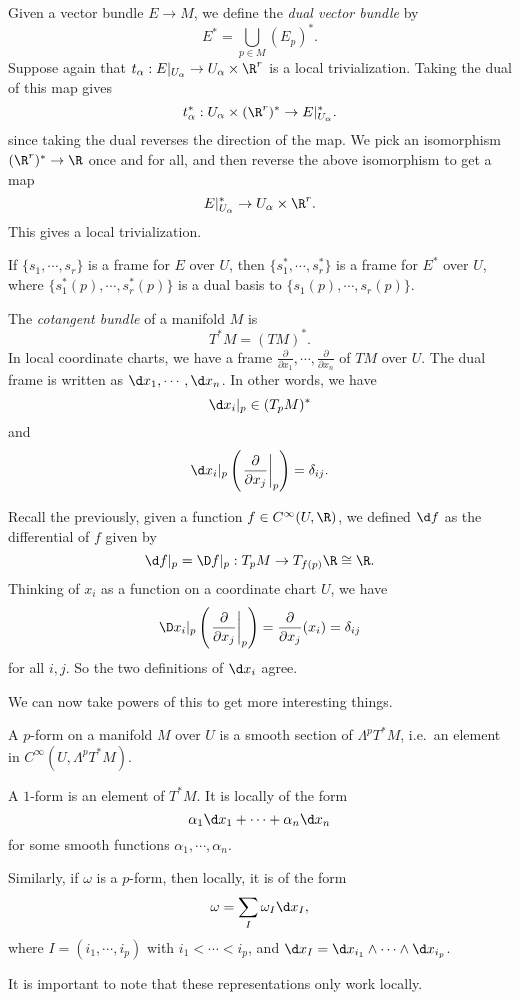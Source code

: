 \documentclass[a4paper]{article}
\begin{document}
\begin{defi}
  Given a vector bundle $E \to M$, we define the \emph{dual vector bundle} by
  \[
    E^* = \bigcup_{p \in M} (E_p)^*.
  \]
  Suppose again that $t_\alpha: E|_{U_\alpha} \to U_\alpha \times \R^r$ is a local trivialization. Taking the dual of this map gives
  \[
    t_\alpha^*: U_\alpha \times (\R^r)^* \to E|_{U_\alpha}^*.
  \]
  since taking the dual reverses the direction of the map. We pick an isomorphism $(\R^r)^* \to \R$ once and for all, and then reverse the above isomorphism to get a map
  \[
    E|_{U_\alpha}^* \to U_\alpha \times \R^r.
  \]
  This gives a local trivialization.
\end{defi}

If $\{s_1, \cdots, s_r\}$ is a frame for $E$ over $U$, then $\{s_1^*, \cdots, s_r^*\}$ is a frame for $E^*$ over $U$, where $\{s_1^{*}(p), \cdots, s_r^*(p)\}$ is a dual basis to $\{s_1(p), \cdots, s_r(p)\}$.

\begin{defi}
  The \emph{cotangent bundle} of a manifold $M$ is
  \[
    T^*M = (TM)^*.
  \]
  In local coordinate charts, we have a frame $\frac{\partial}{\partial x_1}, \cdots, \frac{\partial}{\partial x_n}$ of $TM$ over $U$. The dual frame is written as $\d x_1, \cdots, \d x_n$. In other words, we have
  \[
    \d x_i|_p \in (T_p M)^*
  \]
  and
  \[
    \d x_i|_p\left(\left.\frac{\partial}{\partial x_j}\right|_p\right) = \delta_{ij}.
  \]
\end{defi}

Recall the previously, given a function $f \in C^\infty(U, \R)$, we defined $\d f$ as the differential of $f$ given by
\[
  \d f|_p = \D f|_p: T_p M \to T_{f(p)} \R \cong \R.
\]
Thinking of $x_i$ as a function on a coordinate chart $U$, we have
\[
  \D x_i|_p \left(\left.\frac{\partial}{\partial x_j}\right|_p\right) = \frac{\partial}{\partial x_j}(x_i) = \delta_{ij}
\]
for all $i, j$. So the two definitions of $\d x_i$ agree.

We can now take powers of this to get more interesting things.
\begin{defi}[$p$-form]
  A $p$-form on a manifold $M$ over $U$ is a smooth section of $\Lambda^p T^*M$, i.e.\ an element in $C^\infty (U, \Lambda^p T^*M)$.
\end{defi}

\begin{eg}
  A $1$-form is an element of $T^* M$. It is locally of the form
  \[
    \alpha_1 \d x_1 + \cdots + \alpha_n \d x_n
  \]
  for some smooth functions $\alpha_1, \cdots, \alpha_n$.

  Similarly, if $\omega$ is a $p$-form, then locally, it is of the form
  \[
    \omega = \sum_I \omega_I \d x_I,
  \]
  where $I = (i_1, \cdots, i_p)$ with $i_1 < \cdots < i_p$, and $\d x_I = \d x_{i_1} \wedge \cdots \wedge \d x_{i_p}$.
\end{eg}
It is important to note that these representations only work locally.
\end{document}

